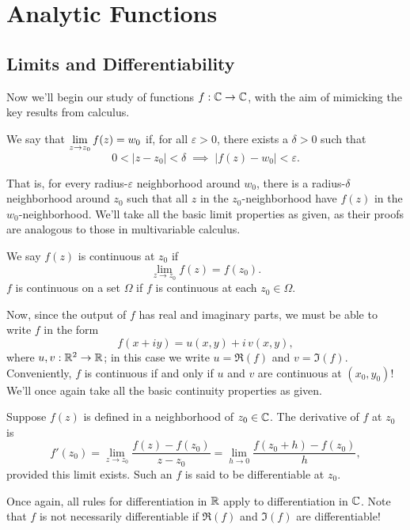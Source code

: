 \documentclass[../m136main.tex]{subfiles}
\begin{document}
\chapter{Analytic Functions}
\section{Limits and Differentiability}
Now we'll begin our study of functions $f : \mathbb{C} \to \mathbb{C}$, with the aim of mimicking the key results from calculus.

\begin{definition}[Limit]
    We say that $\displaystyle \lim_{z \to z_0} f(z) = w_0$ if, for all $\varepsilon > 0$, there exists a $\delta > 0$ such that \vspace{-6pt}
    \[ 0 < |z - z_0| < \delta \;\implies\; |f(z) - w_0| < \varepsilon. \]
\end{definition}

That is, for every radius-$\varepsilon$ neighborhood around $w_0$, there is a radius-$\delta$ neighborhood around $z_0$ such that all $z$ in the $z_0$-neighborhood have $f(z)$ in the $w_0$-neighborhood.
We'll take all the basic limit properties as given, as their proofs are analogous to those in multivariable calculus.

\begin{definition}[Continuity]
    We say $f(z)$ is continuous at $z_0$ if
    \[ \lim_{z \to z_0} f(z) = f(z_0). \]
    $f$ is continuous on a set $\Omega$ if $f$ is continuous at each $z_0 \in \Omega$.
\end{definition}

Now, since the output of $f$ has real and imaginary parts, we must be able to write $f$ in the form
\[ f(x + iy) = u(x,y) + i \, v(x,y), \]
where $u,v : \mathbb{R}^2 \to \mathbb{R}$; in this case we write $u = \Re(f)$ and $v = \Im(f)$.
Conveniently, $f$ is continuous if and only if $u$ and $v$ are continuous at $(x_0, y_0)$!
We'll once again take all the basic continuity properties as given.

\begin{definition}[Derivative]
    Suppose $f(z)$ is defined in a neighborhood of $z_0 \in \mathbb{C}$.
    The derivative of $f$ at $z_0$ is
    \[ f'(z_0) = \lim_{z \to z_0} \frac{f(z) - f(z_0)}{z - z_0} = \lim_{h \to 0} \frac{f(z_0 + h) - f(z_0)}{h}, \]
    provided this limit exists.
    Such an $f$ is said to be differentiable at $z_0$.
\end{definition}

Once again, all rules for differentiation in $\mathbb{R}$ apply to differentiation in $\mathbb{C}$.
Note that $f$ is not necessarily differentiable if $\Re(f)$ and $\Im(f)$ are differentiable!
\end{document}
